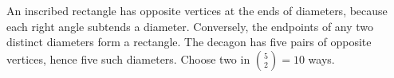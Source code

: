 An inscribed rectangle has opposite vertices at the ends of diameters, because each right angle subtends a diameter. Conversely, the endpoints of any two distinct diameters form a rectangle. The decagon has five pairs of opposite vertices, hence five such diameters. Choose two in $\boxed{\binom52=10}$ ways.
